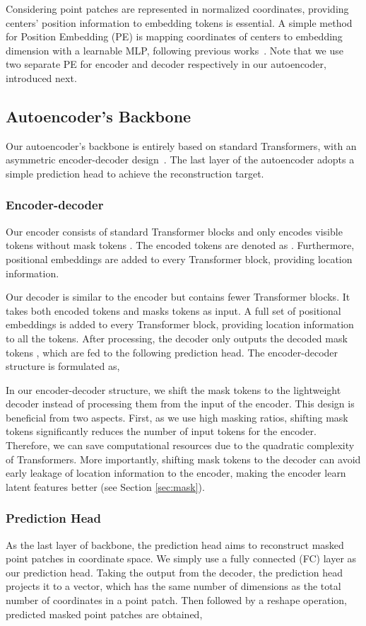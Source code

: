 \documentclass[runningheads]{llncs}
\begin{document}
Considering point patches are represented in normalized coordinates, providing centers' position information to embedding tokens is essential. A simple method for Position Embedding (PE) is mapping coordinates of centers to embedding dimension with a learnable MLP, following previous works~\cite{pointbert,ptpt}. Note that we use two separate PE for encoder and decoder respectively in our autoencoder, introduced next.
\subsection{Autoencoder's Backbone}

Our autoencoder's backbone is entirely based on standard Transformers, with an asymmetric encoder-decoder design~\cite{mae}. The last layer of the autoencoder adopts a simple prediction head to achieve the reconstruction target.

\subsubsection{Encoder-decoder}

 Our encoder consists of standard Transformer blocks and only encodes visible tokens  without mask tokens . The encoded tokens are denoted as . Furthermore, positional embeddings are added to every Transformer block, providing location information. 
 
Our decoder is similar to the encoder but contains fewer Transformer blocks. It takes both encoded tokens  and masks tokens  as input. A full set of positional embeddings is added to every Transformer block, providing location information to all the tokens. After processing, the decoder only outputs the decoded mask tokens , which are fed to the following prediction head. The encoder-decoder structure is formulated as,
 
 
 In our encoder-decoder structure, we shift the mask tokens to the lightweight decoder instead of processing them from the input of the encoder. This design is beneficial from two aspects. First, as we use high masking ratios, shifting mask tokens significantly reduces the number of input tokens for the encoder. Therefore, we can save computational resources due to the quadratic complexity of Transformers. More importantly, shifting mask tokens to the decoder can avoid early leakage of location information to the encoder, making the encoder learn latent features better (see Section \ref{sec:mask}).

\subsubsection{Prediction Head}
As the last layer of backbone, the prediction head aims to reconstruct masked point patches in coordinate space. We simply use a fully connected (FC) layer as our prediction head. Taking the output  from the decoder, the prediction head projects it to a vector, which has the same number of dimensions as the total number of coordinates in a point patch. Then followed by a reshape operation, predicted masked point patches  are obtained,
\end{document}
